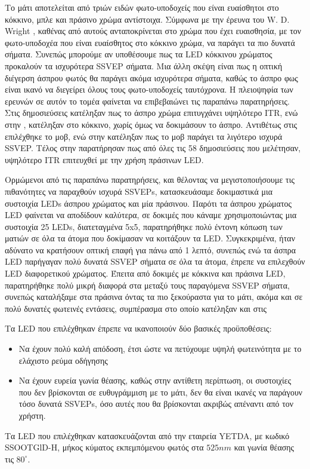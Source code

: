 \documentclass[11pt,a4paper,english,greek,twoside]{../Thesis}
\begin{document}
\par Το μάτι αποτελείται από τριών ειδών φωτο-υποδοχείς που είναι ευαίσθητοι στο κόκκινο, μπλε και πράσινο χρώμα αντίστοιχα. Σύμφωνα με την έρευνα του W. D. Wright \cite{Gregory1978-lj}, καθένας από αυτούς ανταποκρίνεται στο χρώμα που έχει ευαισθησία, με τον φωτο-υποδοχέα που είναι ευαίσθητος στο κόκκινο χρώμα, να παράγει τα πιο δυνατά σήματα. Συνεπώς μπορούμε αν υποθέσουμε πως τα LED κόκκινου χρώματος προκαλούν τα ισχυρότερα SSVEP σήματα. Μια άλλη σκέψη είναι πως η οπτική διέγερση άσπρου φωτός θα παράγει ακόμα ισχυρότερα σήματα, καθώς το άσπρο φως είναι ικανό να διεγείρει όλους τους φωτο-υποδοχείς ταυτόχρονα. Η πλειοψηφία των ερευνών σε αυτόν το τομέα φαίνεται να επιβεβαιώνει τις παραπάνω παρατηρήσεις. Στις δημοσιεύσεις \cite{Bieger2010-bv,Cao2012-yb} κατέληξαν πως το άσπρο χρώμα επιτυγχάνει υψηλότερο ITR, ενώ στην \cite{2015-of}, κατέληξαν στο κόκκινο, χωρίς όμως να δοκιμάσουν το άσπρο. Αντιθέτως στις \cite{Singla2013-pd} επιλέχθηκε το μοβ, ενώ στην \cite{Chu2017-uk} κατέληξαν πως το μοβ παράγει τα λιγότερο ισχυρά SSVEP. Τέλος στην \cite{zhu2010survey} παρατήρησαν πως από όλες τις 58 δημοσιεύσεις που μελέτησαν, υψηλότερο ITR επιτευχθεί με την χρήση πράσινων LED. 

\par Ορμώμενοι από τις παραπάνω παρατηρήσεις, και θέλοντας να μεγιστοποιήσουμε τις πιθανότητες να παραχθούν ισχυρά SSVEPs, κατασκευάσαμε δοκιμαστικά μια συστοιχία LEDs άσπρου χρώματος και μία πράσινου. Παρότι τα άσπρου χρώματος LED φαίνεται να αποδίδουν καλύτερα, σε δοκιμές που κάναμε χρησιμοποιώντας μια συστοιχία 25 LEDs, διατεταγμένα 5x5,  παρατηρήθηκε πολύ έντονη κόπωση των ματιών σε όλα τα άτομα που δοκίμασαν να κοιτάξουν τα LED. Συγκεκριμένα, ήταν αδύνατο να κρατήσουν οπτική επαφή για πάνω από 1 λεπτό, συνεπώς ενώ τα άσπρα LED παρήγαγαν πολύ δυνατά SSVEP σήματα σε όλα τα άτομα, έπρεπε να επιλεχθούν LED διαφορετικού χρώματος.
Έπειτα από δοκιμές με κόκκινα και πράσινα LED, παρατηρήθηκε πολύ μικρή διαφορά στα μεταξύ τους παραγόμενα SSVEP σήματα, συνεπώς καταλήξαμε στα πράσινα όντας τα πιο ξεκούραστα για το μάτι, ακόμα και σε πολύ δυνατές φωτεινές εντάσεις, συμπέρασμα στο οποίο κατέληξαν και στις \cite{2015-of,zhu2010survey,Bieger2010-bv}

\par Τα LED που επιλέχθηκαν έπρεπε να ικανοποιούν δύο βασικές προϋποθέσεις: 
\begin{itemize}
    \item{Nα έχουν πολύ καλή απόδοση, έτσι ώστε να πετύχουμε υψηλή φωτεινότητα με το ελάχιστο ρεύμα οδήγησης}
    \item{Nα έχουν ευρεία γωνία θέασης, καθώς στην αντίθετη περίπτωση, οι συστοιχίες που δεν βρίσκονται σε ευθυγράμμιση με το μάτι, δεν θα είναι ικανές να παράγουν τόσο δυνατά SSVEPs, όσο αυτές που θα βρίσκονται ακριβώς απέναντι από τον χρήστη. }
\end{itemize} 
\par Τα LED που επιλέχθηκαν κατασκευάζονται από την εταιρεία YETDA, με κωδικό SSOOTGlD-H, μήκος κύματος εκπεμπόμενου φωτός στα $525nm$ και γωνία θέασης τις $80^{\circ}$.
\end{document}
